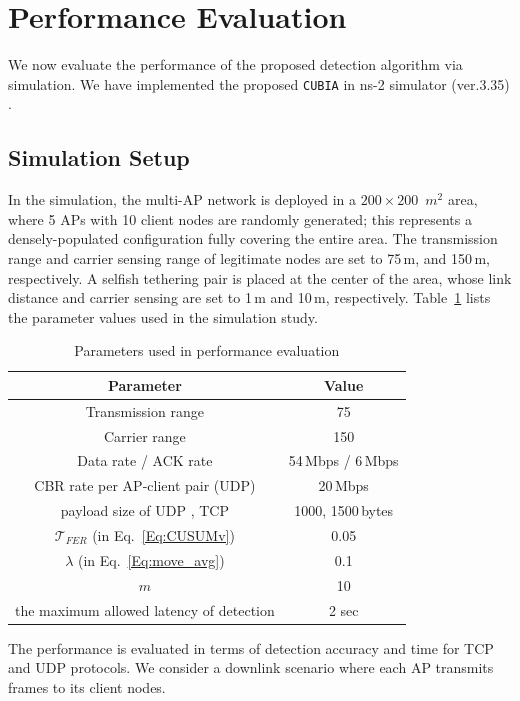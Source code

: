\section{Performance Evaluation}

We now evaluate the performance of the
proposed detection algorithm via simulation.
We have implemented the proposed {\tt CUBIA} in ns-2
simulator (ver.3.35) \cite{NS2}.

\subsection{Simulation Setup}

%
In the simulation, the multi-AP network is deployed in a $200\times200$
\,$m^2$ area, where 5 APs with 10 client nodes are randomly generated;
this represents a densely-populated configuration fully covering
the entire area.
%
The transmission range and carrier sensing range of legitimate nodes
are set to 75\,m, and 150\,m, respectively. A selfish tethering pair
is placed at the center of the area, whose link distance and carrier
sensing are set to 1\,m and 10\,m, respectively. Table~\ref{table_sim_param}
lists the parameter values used in the simulation study.

\begin{table}[ht]
\renewcommand{\arraystretch}{1.2}
\caption{Parameters used in performance evaluation}
\label{table_sim_param} \centering
\begin{tabular}{|c|c|}
\hline \bfseries Parameter & \bfseries Value \\
\hline
 Transmission range  & 75 \\
 Carrier range       & 150\\
 Data rate / ACK rate & 54\,Mbps / 6\,Mbps \\
 CBR rate per AP-client pair (UDP)& 20\,Mbps \\
 payload size of UDP , TCP& 1000, 1500\,bytes   \\
 $\mathcal{T}_{FER}$ (in Eq.~\eqref{Eq:CUSUMv}) & 0.05 \\
 $\lambda$ (in Eq.~\eqref{Eq:move_avg}) & 0.1\\
 $m$ & 10\\
 the maximum allowed latency of detection & 2 sec\\
\hline
\end{tabular}
\end{table}

The performance is evaluated in terms of detection accuracy
and time for TCP and UDP protocols. We consider a downlink
scenario where each AP transmits frames to its client nodes.


